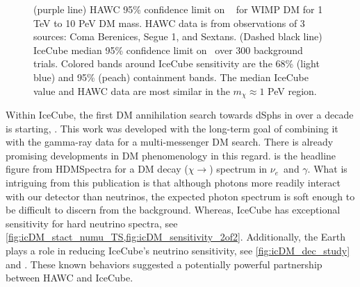 \begin{figure}[t]
    \caption{(purple line) HAWC 95\% confidence limit on \sv~ for WIMP DM for 1 TeV to 10 PeV DM mass. HAWC data is from observations of 3 sources: Coma Berenices, Segue 1, and Sextans. (Dashed black line) IceCube median 95\% confidence limit on \sv~over 300 background trials. Colored bands around IceCube sensitivity are the 68\% (light blue) and 95\% (peach) containment bands. The median IceCube value and HAWC data are most similar in the $m_\chi \approx 1$ PeV region.}
    \label{fig:nuDuck_sens}
\end{figure}

Within IceCube, the first DM annihilation search towards dSphs in over a decade is starting, .
This work was developed with the long-term goal of combining it with the gamma-ray data for a multi-messenger DM search.
There is already promising developments in DM phenomenology in this regard.
 is the headline figure from HDMSpectra \cite{Rodd:HDM_spec} for a DM decay ($\chi \rightarrow$) spectrum in $\nu_e$~and $\gamma$.
What is intriguing from this publication is that although photons more readily interact with our detector than neutrinos, the expected photon spectrum is soft enough to be difficult to discern from the background.
Whereas, IceCube has exceptional sensitivity for hard neutrino spectra, see \cref{fig:icDM_stact_numu_TS,fig:icDM_sensitivity_2of2}.
Additionally, the Earth plays a role in reducing IceCube's neutrino sensitivity, see \cref{fig:icDM_dec_study} and \cite{IC3:Earth_Attenuation}.
These known behaviors suggested a potentially powerful partnership between HAWC and IceCube.

